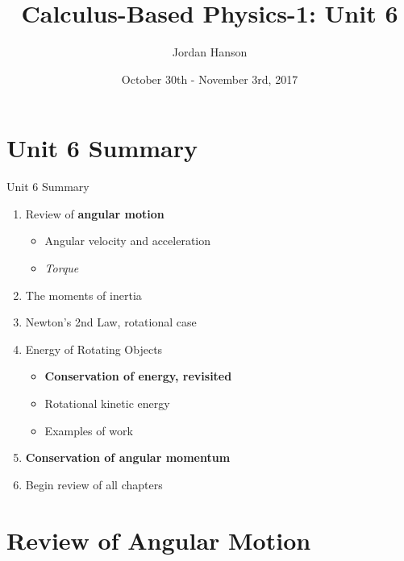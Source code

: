 \documentclass{beamer}
\title{Calculus-Based Physics-1: Unit 6}
\date{October 30th - November 3rd, 2017}
\author{Jordan Hanson}
\institute{Whittier College Department of Physics and Astronomy}
\begin{document}
\maketitle

\section{Unit 6 Summary}

\begin{frame}{Unit 6 Summary}
\begin{enumerate}
\item Review of \textbf{angular motion}
\begin{itemize}
\item Angular velocity and acceleration
\item \textit{Torque}
\end{itemize}
\item \alert{The moments of inertia}
\item Newton's 2nd Law, rotational case
\item Energy of Rotating Objects
\begin{itemize}
\item \textbf{Conservation of energy, revisited}
\item Rotational kinetic energy
\item Examples of work
\end{itemize}
\item \textbf{\alert{Conservation of angular momentum}}
\item Begin review of all chapters
\end{enumerate}
\end{frame}

\section{Review of Angular Motion}
\end{document}
